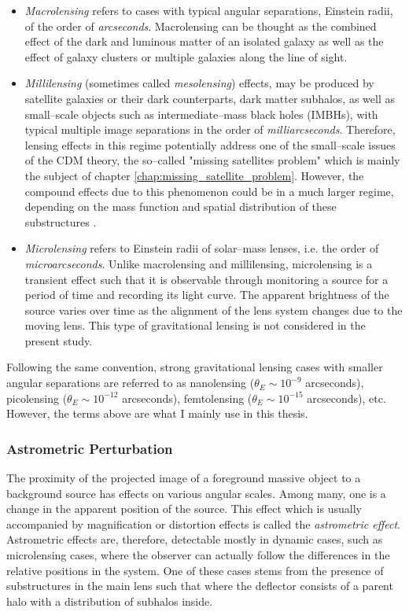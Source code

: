 \documentclass[paper=a4, fontsize=11pt]{scrartcl} %
\numberwithin{equation}{section} %
\numberwithin{figure}{section} %
\numberwithin{table}{section} %
\begin{document}
\begin{itemize} 
\item \emph{Macrolensing} refers to cases with typical angular separations, Einstein radii, of the order of \emph{arcseconds}. Macrolensing can be thought as the combined effect of the dark and luminous matter of an isolated galaxy as well as the effect of galaxy clusters or multiple galaxies along the line of sight. 
\item \emph{Millilensing} (sometimes called \emph{mesolensing}) effects, may be produced by satellite galaxies or their dark counterparts, dark matter subhalos, as well as small--scale objects such as intermediate--mass black holes (IMBHs), with typical multiple image separations in the order of \emph{milliarcseconds}. Therefore, lensing effects in this regime potentially address one of the small--scale issues of the CDM theory, the so--called "missing satellites problem" which is mainly the subject of chapter \ref{chap:missing_satellite_problem}. However, the compound effects due to this phenomenon could be in a much larger regime, depending on the mass function and spatial distribution of these substructures \citet{Treu10}.
\item \emph{Microlensing} refers to Einstein radii of solar--mass lenses, i.e. the order of \emph{microarcseconds}. Unlike macrolensing and millilensing, microlensing is a transient effect such that it is observable through monitoring a source for a period of time and recording its light curve. The apparent brightness of the source varies over time as the alignment of the lens system changes due to the moving lens. This type of gravitational lensing is not considered in the present study.
\end{itemize}

Following the same convention, strong gravitational lensing cases with smaller angular separations are referred to as nanolensing ($\theta_E \sim 10^{-9}$ arcseconds), picolensing ($\theta_E \sim 10^{-12}$ arcseconds), femtolensing ($\theta_E \sim 10^{-15}$ arcseconds), etc. However, the terms above are what I mainly use in this thesis.

 \subsubsection{Astrometric Perturbation}
 The proximity of the projected image of a foreground massive object to a background source has effects on various angular scales. Among many, one is a change in the apparent position of the source. This effect which is usually accompanied by magnification or distortion effects is called the \emph{astrometric effect}. Astrometric effects are, therefore, detectable mostly in dynamic cases, such as microlensing cases, where the observer can actually follow the differences in the relative positions in the system. One of these cases stems from the presence of substructures in the main lens such that where the deflector consists of a parent halo with a distribution of subhalos inside. 
 
\end{document}
